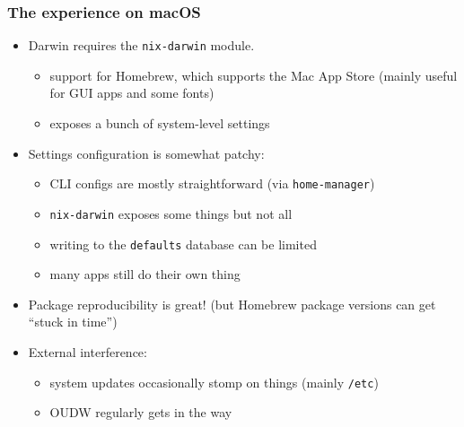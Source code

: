 \documentclass[nochapters]{otagoslides}
\begin{document}
\begin{frame}
    \frametitle{The experience on macOS}

    \begin{itemize}
        \item Darwin requires the \texttt{nix-darwin} module.
        \begin{itemize}
            \item support for Homebrew, which supports the Mac App Store \tinyskip
            {\tiny (mainly useful for GUI apps and some fonts)}
            \item exposes a bunch of system-level settings
        \end{itemize}
        \item Settings configuration is somewhat patchy:
        \begin{itemize}
            \item CLI configs are mostly straightforward {\tiny (via \texttt{home-manager})}
            \item \texttt{nix-darwin} exposes some things but not all
            \item writing to the \texttt{defaults} database can be limited
            \item many apps still do their own thing
        \end{itemize}
        \item Package reproducibility is great! \tinyskip
        {\tiny(but Homebrew package versions can get ``stuck in time'')}
        \item External interference:
        \begin{itemize}
            \item system updates occasionally stomp on things {\tiny (mainly \texttt{/etc})}
            \item OUDW regularly gets in the way 
        \end{itemize}
    \end{itemize}
\end{frame}


\end{document}
